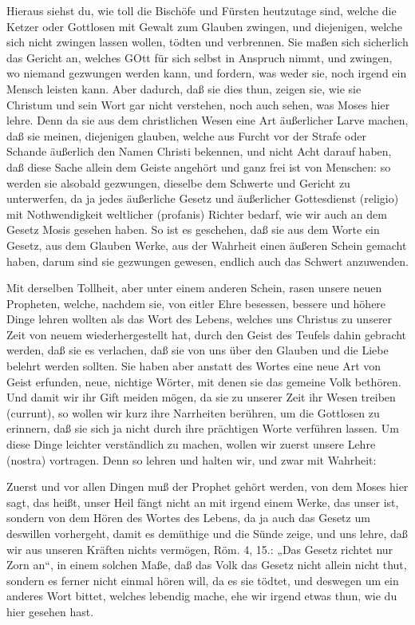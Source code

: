 Hieraus siehst du, wie toll die Bischöfe und Fürsten heutzutage sind, welche die Ketzer oder Gottlosen mit Gewalt zum Glauben zwingen, und diejenigen, welche sich nicht zwingen lassen wollen, tödten und verbrennen. Sie maßen sich sicherlich das Gericht an, welches GOtt für sich selbst in Anspruch nimmt, und zwingen, wo niemand gezwungen werden kann, und fordern, was weder sie, noch irgend ein Mensch leisten kann. Aber dadurch, daß sie dies thun, zeigen sie, wie sie Christum und sein Wort gar nicht verstehen, noch auch sehen, was Moses hier lehre. Denn da sie aus dem christlichen Wesen eine Art äußerlicher Larve machen, daß sie meinen, diejenigen glauben, welche aus Furcht vor der Strafe oder Schande äußerlich den Namen Christi bekennen, und nicht Acht darauf haben, daß diese Sache allein dem Geiste angehört und ganz frei ist von Menschen: so werden sie alsobald gezwungen, dieselbe dem Schwerte und Gericht zu unterwerfen, da ja jedes äußerliche Gesetz und äußerlicher Gottesdienst (religio) mit Nothwendigkeit weltlicher (profanis) Richter bedarf, wie wir auch an dem Gesetz Mosis gesehen haben. So ist es geschehen, daß sie aus dem Worte ein Gesetz, aus dem Glauben Werke, aus der Wahrheit einen äußeren Schein gemacht haben, darum sind sie gezwungen gewesen, endlich auch das Schwert anzuwenden.

Mit derselben Tollheit, aber unter einem anderen Schein, rasen unsere neuen Propheten, welche, nachdem sie, von eitler Ehre besessen, bessere und höhere Dinge lehren wollten als das Wort des Lebens, welches uns Christus zu unserer Zeit von neuem wiederhergestellt hat, durch den Geist des Teufels dahin gebracht werden, daß sie es verlachen, daß sie von uns über den Glauben und die Liebe belehrt werden sollten. Sie haben aber anstatt des Wortes eine neue Art von Geist erfunden, neue, nichtige Wörter, mit denen sie das gemeine Volk bethören. Und damit wir ihr Gift meiden mögen, da sie zu unserer Zeit ihr Wesen treiben (currunt), so wollen wir kurz ihre Narrheiten berühren, um die Gottlosen zu erinnern, daß sie sich ja nicht durch ihre prächtigen Worte verführen lassen. Um diese Dinge leichter verständlich zu machen, wollen wir zuerst unsere Lehre (nostra) vortragen. Denn so lehren und halten wir, und zwar mit Wahrheit:

Zuerst und vor allen Dingen muß der Prophet gehört werden, von dem Moses hier sagt, das heißt, unser Heil fängt nicht an mit irgend einem Werke, das unser ist, sondern von dem Hören des Wortes des Lebens, da ja auch das Gesetz um deswillen vorhergeht, damit es demüthige und die Sünde zeige, und uns lehre, daß wir aus unseren Kräften nichts vermögen, Röm. 4, 15.: „Das Gesetz richtet nur Zorn an“, in einem solchen Maße, daß das Volk das Gesetz nicht allein nicht thut, sondern es ferner nicht einmal hören will, da es sie tödtet, und deswegen um ein anderes Wort bittet, welches
lebendig mache, ehe wir irgend etwas thun, wie du hier gesehen hast.

